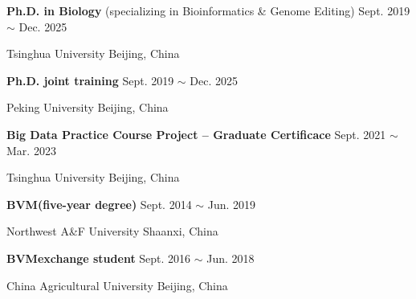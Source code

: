 

\renewcommand{\thefootnote}{\fnsymbol{footnote}}
\setcounter{footnote}{0}
    \textbf{Ph.D. in Biology\footnotemark[1]} (specializing in Bioinformatics \& Genome Editing) \hfill Sept. 2019 $\sim$ Dec. 2025\footnotemark[2]

    Tsinghua University \hfill Beijing, China
    
    \textbf{Ph.D. joint training\footnotemark[1]} \hfill Sept. 2019 $\sim$ Dec. 2025\footnotemark[2]
    
    Peking University \hfill Beijing, China

    \textbf{Big Data Practice Course Project -- Graduate Certificace} \hfill Sept. 2021 $\sim$ Mar. 2023
    
    Tsinghua University \hfill Beijing, China

    \textbf{BVM\footnotemark[3] (five-year degree)} \hfill Sept. 2014 $\sim$ Jun. 2019
    
    Northwest A\&F University \hfill Shaanxi, China

    \textbf{BVM\footnotemark[3] exchange student} \hfill Sept. 2016 $\sim$ Jun. 2018
    
    China Agricultural University \hfill Beijing, China

\renewcommand{\thefootnote}{\arabic{footnote}}
\setcounter{footnote}{1}
